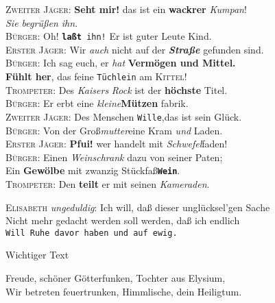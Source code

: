 \documentclass[a4paper, 12pt]{article} %
\begin{document}

\textsc{Zweiter Jäger:} \textbf{Seht mir!} das ist ein \textbf{\large wackrer} 
\textsl{Kumpan}!\\
\hspace*{34mm}\textit{Sie begrüßen ihn.}\\
\textsc{Bürger:} {\Large Oh!} \texttt{\textbf{laßt} ihn!} Er ist 
\textsf{guter {\large Leute}} Kind. \\
\textsc{Erster Jäger:} Wir \emph{auch} nicht auf der \textit{\Large \textbf{Straße}}
gefunden sind. \\
\textsc{Bürger:} {\tiny Ich sag euch,} er \emph{hat} \textsf{\textbf{Vermögen und Mittel.}}\\
\hspace*{1cm} \textbf{Fühlt \large{her}},
das feine \texttt{Tüchlein} am \textsc{\Large Kittel}{\Huge !}\\
\textsc{Trompeter:} Des \emph{Kaisers} 
\textsl{Rock} ist der {\tiny\bfseries höchste} Titel.\\
\textsc{Bürger:} Er erbt eine \emph{\tiny kleine}\textbf{Mützen}
fabr{\Large i}{\Huge k}.\\
\textsc{Zweiter Jäger:} Des Menschen \texttt{Wille},das
 ist sein \textsf{Glück}.\\
 \textsc{Bürger:} Von der {\Large Groß}\textit{mutter}eine
  Kram \emph{und} Laden.\\
  \textsc{Erster Jäger:} \textbf{Pfui!} wer handelt
  mit \textit{Schwefel}faden!\\
  {\large\textsc{Bürger:} Einen \emph{Weinschrank}
  {\small dazu von seiner} Paten;}\\
  \hspace*{2ex} Ein \textbf{Gewölbe} mit zwanzig Stückfaß\texttt{\bfseries Wein}.\\
  \textsc{Trompeter:} Den \textbf{teilt} er mit
  seinen \emph{Kameraden}.\par\bigskip


  \textsc{Elisabeth} \emph{ungeduldig}: \textsf{Ich will, daß dieser 
  unglücksel'gen Sache}\\
  Nicht mehr gedacht werden soll werden, daß ich endlich\\
  \texttt{Will Ruhe davor haben und auf ewig.}\par\bigskip


Wichtiger Text \quad{}\par\bigskip



{\suetterlin\Large Freude, schöner Götterfunken, Tochter aus Elysium,\\
Wir betreten feuertrunken, Himmlische, dein Heiligtum.}
\end{document}
